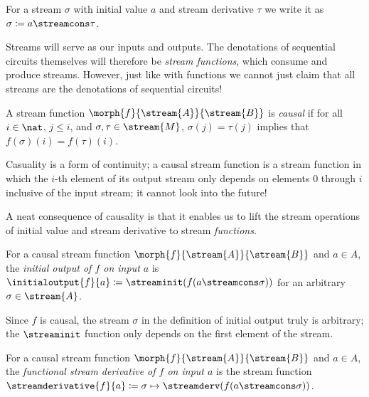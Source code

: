 \begin{notation}
    For a stream \(\sigma\) with initial value \(a\) and stream derivative
    \(\tau\) we write it as \(\sigma \coloneqq a \streamcons \tau\).
\end{notation}

Streams will serve as our inputs and outputs.
The denotations of sequential circuits themselves will therefore be
\emph{stream functions}, which consume and produce streams.
However, just like with functions we cannot just claim that all streams are the
denotations of sequential circuits!

\begin{definition}
    A stream function \(\morph{f}{\stream{A}}{\stream{B}}\) is \emph{causal} if
    for all \(i \in \nat\), \(j \leq i\), and \(\sigma,\tau \in \stream{M}\),
    \(\sigma(j) = \tau(j)\) implies that \(f(\sigma)(i) = f(\tau)(i)\).
\end{definition}

Casuality is a form of continuity; a causal stream function is a stream function
in which the \(i\)-th element of its output stream only depends on elements
\(0\) through \(i\) inclusive of the input stream; it cannot look into the
future!

A neat consequence of causality is that it enables us to lift the stream
operations of initial value and stream derivative to stream \emph{functions}.

\begin{definition}
    For a causal stream function \(\morph{f}{\stream{A}}{\stream{B}}\) and
    \(a \in A\), the \emph{initial output of \(f\) on input \(a\)} is
    \(\initialoutput{f}{a} \coloneqq \streaminit(f(a \streamcons \sigma))\) for an
    arbitrary \(\sigma \in \stream{A}\).
\end{definition}

Since \(f\) is causal, the stream \(\sigma\) in the definition of initial
output truly is arbitrary; the \(\streaminit\) function only depends on the
first element of the stream.

\begin{definition}
    For a causal stream function \(\morph{f}{\stream{A}}{\stream{B}}\) and
    \(a \in A\), the
    \emph{functional stream derivative of \(f\) on input \(a\)} is the
    stream function \(
        \streamderivative{f}{a}
        \coloneqq
        \sigma \mapsto \streamderv(f(a \streamcons \sigma))
    \).
\end{definition}


